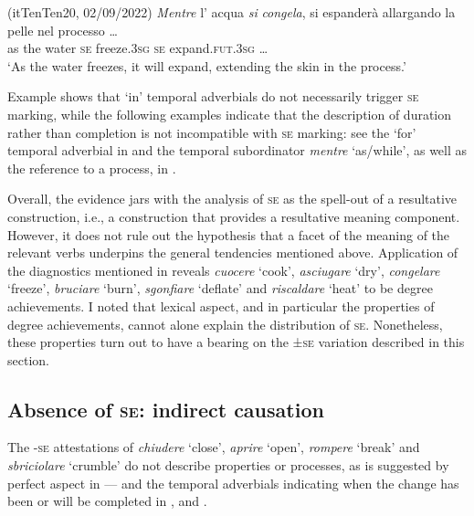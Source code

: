 \documentclass[output=paper,colorlinks,citecolor=brown
]{langscibook}
\begin{document}
\hspace*{\fill}(itTenTen20, 02/09/2022)\quad
\ea \label{bentley_example_28}
    \gll \textit{Mentre}	l’		acqua		\textit{si}
    \textit{congela},			si		espanderà {	allargando la pelle
      nel processo \ldots}\\
    	as						the	water		\textsc{se}		freeze.3\textsc{sg}		\textsc{se}		expand.\textsc{fut}.3\textsc{sg} {\ldots} \\
    \glt 	‘As the water freezes, it will expand, extending the skin in the process.’
\z

Example  shows that ‘in’ temporal adverbials do not necessarily trigger \textsc{se} marking, while the following examples indicate that the description of duration rather than completion is not incompatible with \textsc{se} marking: see the ‘for’ temporal adverbial in  and the temporal subordinator \textit{mentre} ‘as/while’, as well as the reference to a process, in . 

Overall, the evidence jars with the analysis of \textsc{se} as the spell-out of a resultative construction, i.e., a construction that provides a resultative meaning component. However, it does not rule out the hypothesis that a facet of the meaning of the relevant verbs underpins the general tendencies mentioned above. Application of the diagnostics mentioned in  reveals \textit{cuocere} ‘cook’, \textit{asciugare} ‘dry’, \textit{congelare} ‘freeze’, \textit{bruciare} ‘burn’, \textit{sgonfiare} ‘deflate’ and \textit{riscaldare} ‘heat’ to be degree achievements. I noted that lexical aspect, and in particular the properties of degree achievements, cannot alone explain the distribution of \textsc{se}. Nonetheless, these properties turn out to have a bearing on the ±\textsc{se} variation described in this section. 

\subsection{Absence of \textsc{se}: indirect causation}
\label{bentley_section_4.2}
The -\textsc{se} attestations of \textit{chiudere} ‘close’, \textit{aprire} ‘open’, \textit{rompere} ‘break’ and \textit{sbriciolare} ‘crumble’ do not describe properties or processes, as is suggested by perfect aspect in — and the temporal adverbials indicating when the change has been or will be completed in ,  and .
\end{document}
